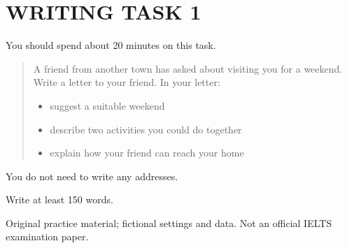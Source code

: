 \section*{WRITING TASK 1}
You should spend about 20 minutes on this task.

\begin{quote}\large A friend from another town has asked about visiting you for a weekend. Write a letter to your friend. In your letter:
\begin{itemize}
\item suggest a suitable weekend
\item describe two activities you could do together
\item explain how your friend can reach your home
\end{itemize}
\end{quote}
You do not need to write any addresses.

Write at least 150 words.
\par\bigskip
{\footnotesize\color{gray} Original practice material; fictional settings and data. Not an official IELTS examination paper.}
